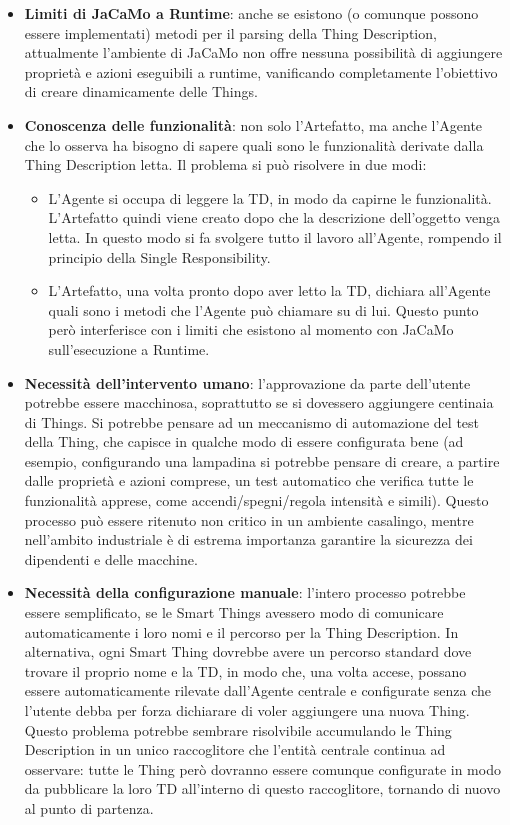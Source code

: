 \documentclass[12pt,a4paper,openright,oneside]{report}
\begin{document}
\begin{itemize}
	\item \textbf{Limiti di JaCaMo a Runtime}: anche se esistono (o comunque possono essere implementati) metodi per il parsing della Thing Description, attualmente l'ambiente di JaCaMo non offre nessuna possibilità di aggiungere proprietà e azioni eseguibili a runtime, vanificando completamente l'obiettivo di creare dinamicamente delle Things. 
	
	\item \textbf{Conoscenza delle funzionalità}: non solo l'Artefatto, ma anche l'Agente che lo osserva ha bisogno di sapere quali sono le funzionalità derivate dalla Thing Description letta. Il problema si può risolvere in due modi:
	
	\begin{itemize}
		\item L'Agente si occupa di leggere la TD, in modo da capirne le funzionalità. L'Artefatto quindi viene creato dopo che la descrizione dell'oggetto venga letta. In questo modo si fa svolgere tutto il lavoro all'Agente, rompendo il principio della Single Responsibility.
		
		\item L'Artefatto, una volta pronto dopo aver letto la TD, dichiara all'Agente quali sono i metodi che l'Agente può chiamare su di lui. Questo punto però interferisce con i limiti che esistono al momento con JaCaMo sull'esecuzione a Runtime.
	\end{itemize}
	
	\item \textbf{Necessità dell'intervento umano}: l'approvazione da parte dell'utente potrebbe essere macchinosa, soprattutto se si dovessero aggiungere centinaia di Things. Si potrebbe pensare ad un meccanismo di automazione del test della Thing, che capisce in qualche modo di essere configurata bene (ad esempio, configurando una lampadina si potrebbe pensare di creare, a partire dalle proprietà e azioni comprese, un test automatico che verifica tutte le funzionalità apprese, come accendi/spegni/regola intensità e simili). Questo processo può essere ritenuto non critico in un ambiente casalingo, mentre nell'ambito industriale è di estrema importanza garantire la sicurezza dei dipendenti e delle macchine.
	
	\item \textbf{Necessità della configurazione manuale}: l'intero processo potrebbe essere semplificato, se le Smart Things avessero modo di comunicare automaticamente i loro nomi e il percorso per la Thing Description. In alternativa, ogni Smart Thing dovrebbe avere un percorso standard dove trovare il proprio nome e la TD, in modo che, una volta accese, possano essere automaticamente rilevate dall'Agente centrale e configurate senza che l'utente debba per forza dichiarare di voler aggiungere una nuova Thing. Questo problema potrebbe sembrare risolvibile accumulando le Thing Description in un unico raccoglitore che l'entità centrale continua ad osservare: tutte le Thing però dovranno essere comunque configurate in modo da pubblicare la loro TD all'interno di questo raccoglitore, tornando di nuovo al punto di partenza.
	

\end{itemize}
\end{document}
